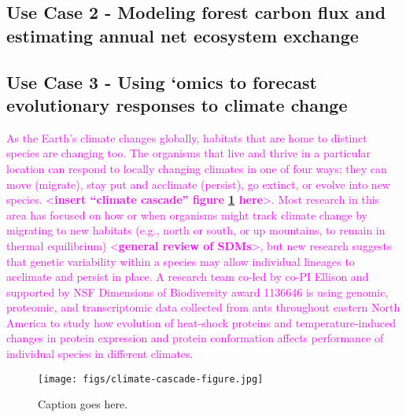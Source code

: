 \documentclass[10pt]{article}
\begin{document}
\subsection{Use Case 2 - Modeling forest carbon flux and estimating annual net ecosystem exchange}

\subsection{Use Case 3 - Using `omics to forecast evolutionary responses to climate change}

\textcolor{magenta}{As the Earth's climate changes globally, habitats
that are home to distinct species are changing too. The organisms that
live and thrive in a particular location can respond to locally
changing climates in one of four ways: they can move (migrate), stay
put and acclimate (persist), go extinct, or evolve into new
species. <\textbf{insert ``climate cascade'' figure \ref{fig:climate-cascade} here}>. Most
research in this area has focused on how or when organisms might track
climate change by migrating to new habitats (e.g., north or south, or
up mountains, to remain in thermal equilibrium) <\textbf{general
  review of SDMs}>, but new research suggests that genetic variability
within a species may allow individual lineages to acclimate and
persist in place. A research team co-led by co-PI Ellison and
supported by NSF Dimensions of Biodiversity award 1136646 is using
genomic, proteomic, and transcriptomic data collected from ants
throughout eastern North America to study how evolution of heat-shock
proteins and temperature-induced changes in protein expression and
protein conformation affects performance of individual species in
different climates.}

\begin{figure}
\texttt{[image: figs/climate-cascade-figure.jpg]}
\label{fig:climate-cascade}
\caption{\small{Caption goes here.}}
\end{figure}
\end{document}
